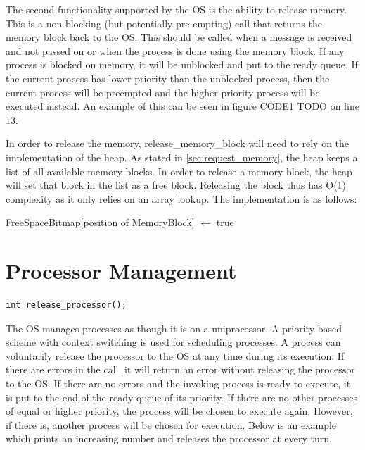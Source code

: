 \documentclass[12pt]{report}
\begin{document}
\par The second functionality supported by the OS is the ability to release memory. This is a non-blocking (but potentially pre-empting) call that returns the memory block back to the OS. This should be called when a message is received and not passed on or when the process is done using the memory block. If any process is blocked on memory, it will be unblocked and put to the ready queue. If the current process has lower priority than the unblocked process, then the current process will be preempted and the higher priority process will be executed instead. An example of this can be seen in figure CODE1 TODO on line 13.

\par In order to release the memory, release\_memory\_block will need to rely on the implementation of the heap. As stated in \ref{sec:request_memory}, the heap keeps a list of all available memory blocks. In order to release a memory block, the heap will set that block in the list as a free block. Releasing the block thus has O(1) complexity as it only relies on an array lookup. The implementation is as follows:
\begin{algorithmic}
    \State FreeSpaceBitmap[position of MemoryBlock] $\gets$ true
  \EndFunction
\end{algorithmic}

\bigskip

\section{Processor Management}
\begin{lstlisting}
int release_processor();
\end{lstlisting}

\par The OS manages processes as though it is on a uniprocessor. A priority based scheme with context switching is used for scheduling processes. A process can voluntarily release the processor to the OS at any time during its execution. If there are errors in the call, it will return an error without releasing the processor to the OS. If there are no errors and the invoking process is ready to execute, it is put to the end of the ready queue of its priority. If there are no other processes of equal or higher priority, the process will be chosen to execute again. However, if there is, another process will be chosen for execution. Below is an example which prints an increasing number and releases the processor at every turn.
\end{document}
